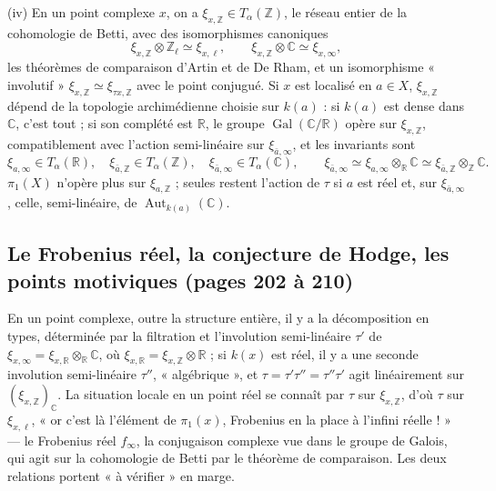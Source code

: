\documentclass[11pt,a4paper]{article}
\begin{document}
(iv) En un point complexe $x$, on a $\xi_{x,\mathbb{Z}} \in
T_{\alpha}(\mathbb{Z})$, le réseau entier de la cohomologie de Betti, avec des
isomorphismes canoniques
\[
  \xi_{x,\mathbb{Z}} \otimes \mathbb{Z}_{\ell} \simeq \xi_{x,\ell}, \qquad
  \xi_{x,\mathbb{Z}} \otimes \mathbb{C} \simeq \xi_{x,\infty} ,
\]
les théorèmes de comparaison d'Artin et de De Rham, et un isomorphisme
« involutif » $\xi_{x,\mathbb{Z}} \simeq \xi_{\tau x,\mathbb{Z}}$ avec le point
conjugué. Si $x$ est localisé en $a \in X$, $\xi_{x,\mathbb{Z}}$ dépend de la
topologie archimédienne choisie sur $k(a)$ : si $k(a)$ est dense dans
$\mathbb{C}$, c'est tout ; si son complété est $\mathbb{R}$, le groupe
$\operatorname{Gal}(\mathbb{C}/\mathbb{R})$ opère sur $\xi_{x,\mathbb{Z}}$,
compatiblement avec l'action semi-linéaire sur $\xi_{\bar{a},\infty}$, et les
invariants sont
\[
  \xi_{a,\infty} \in T_{\alpha}(\mathbb{R}), \quad \xi_{\bar{a},\mathbb{Z}} \in
  T_{\alpha}(\mathbb{Z}), \quad \xi_{\bar{a},\infty} \in T_{\alpha}(\mathbb{C}),
  \qquad \xi_{\bar{a},\infty} \simeq \xi_{a,\infty} \otimes_{\mathbb{R}}
  \mathbb{C} \simeq \xi_{\bar{a},\mathbb{Z}} \otimes_{\mathbb{Z}} \mathbb{C} .
\]
$\pi_{1}(X)$ n'opère plus sur $\xi_{a,\mathbb{Z}}$ ; seules restent l'action de
$\tau$ si $a$ est réel et, sur $\xi_{\bar{a},\infty}$, celle, semi-linéaire, de
$\operatorname{Aut}_{k(a)}(\mathbb{C})$.

\subsection*{Le Frobenius réel, la conjecture de Hodge, les points motiviques (pages 202 à 210)}

En un point complexe, outre la structure entière, il y a la décomposition en
types, déterminée par la filtration et l'involution semi-linéaire $\tau'$ de
$\xi_{x,\infty} = \xi_{x,\mathbb{R}} \otimes_{\mathbb{R}} \mathbb{C}$, où
$\xi_{x,\mathbb{R}} = \xi_{x,\mathbb{Z}} \otimes \mathbb{R}$ ; si $k(x)$ est réel,
il y a une seconde involution semi-linéaire $\tau''$, « algébrique », et
$\tau = \tau'\tau'' = \tau''\tau'$ agit linéairement sur
$(\xi_{x,\mathbb{Z}})_{\mathbb{C}}$. La situation locale en un point réel se
connaît par $\tau$ sur $\xi_{x,\mathbb{Z}}$, d'où $\tau$ sur $\xi_{x,\ell}$,
« or c'est là l'élément de $\pi_{1}(x)$, Frobenius en la place à l'infini
réelle ! » --- le Frobenius réel $f_{\infty}$, la conjugaison complexe vue dans le
groupe de Galois, qui agit sur la cohomologie de Betti par le théorème de
comparaison. Les deux relations portent « à vérifier » en marge.
\end{document}
